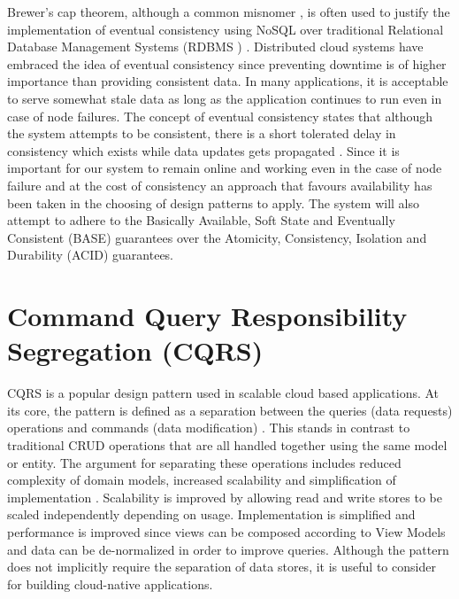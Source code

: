 Brewer's cap theorem, although a common misnomer \cite{Brewer2012}, is often used to justify the implementation of eventual consistency using NoSQL over traditional Relational Database Management Systems (RDBMS ) \cite{Wilder2012-so}. Distributed cloud systems have embraced the idea of eventual consistency since preventing downtime is of higher importance than providing consistent data. In many applications, it is acceptable to serve somewhat stale data as long as the application continues to run even in case of node failures. The concept of eventual consistency states that although the system attempts to be consistent, there is a short tolerated delay in consistency which exists while data updates gets propagated \cite{Wilder2012-so}. Since it is important for our system to remain online and working even in the case of node failure and at the cost of consistency an approach that favours availability has been taken in the choosing of design patterns to apply. The system will also attempt to adhere to the Basically Available, Soft State and Eventually Consistent (BASE) guarantees over the Atomicity, Consistency, Isolation and Durability (ACID) guarantees.
 
 
\section{Command Query Responsibility Segregation (CQRS)}
 
CQRS is a popular design pattern used in scalable cloud based applications. At its core, the pattern is defined as a separation between the queries (data requests) operations and commands (data modification) \cite{Homer2014}. This stands in contrast to traditional CRUD operations that are all handled together using the same model or entity. The argument for separating these operations includes reduced complexity of domain models, increased scalability and simplification of implementation \cite{Homer2014}. Scalability is improved by allowing read and write stores to be scaled independently depending on usage. Implementation is simplified and performance is improved since views can be composed according to View Models and data can be de-normalized in order to improve queries. Although the pattern does not implicitly require the separation of data stores, it is useful to consider for building cloud-native applications. 
 
